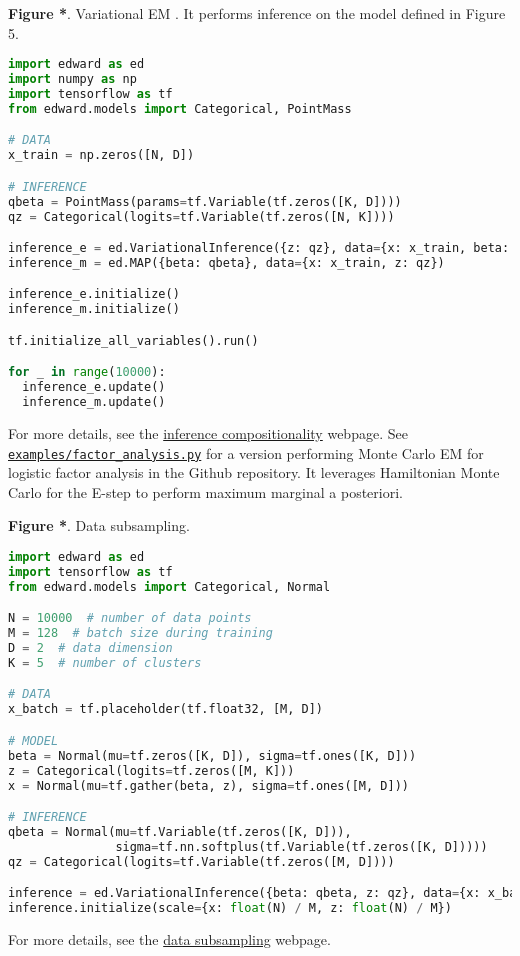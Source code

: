 \textbf{Figure *}. Variational EM \citep{neal1993new}.
It performs inference on the model defined in Figure 5.
\begin{lstlisting}[language=python]
import edward as ed
import numpy as np
import tensorflow as tf
from edward.models import Categorical, PointMass

# DATA
x_train = np.zeros([N, D])

# INFERENCE
qbeta = PointMass(params=tf.Variable(tf.zeros([K, D])))
qz = Categorical(logits=tf.Variable(tf.zeros([N, K])))

inference_e = ed.VariationalInference({z: qz}, data={x: x_train, beta: qbeta})
inference_m = ed.MAP({beta: qbeta}, data={x: x_train, z: qz})

inference_e.initialize()
inference_m.initialize()

tf.initialize_all_variables().run()

for _ in range(10000):
  inference_e.update()
  inference_m.update()
\end{lstlisting}
For more details, see the
\href{/api/inference-compositionality}{inference compositionality} webpage.
See
\href{https://github.com/blei-lab/edward/blob/master/examples/factor_analysis.py}{\texttt{examples/factor_analysis.py}} for
a version performing Monte Carlo EM for logistic factor analysis
in the Github repository.
It leverages Hamiltonian Monte Carlo for the E-step to perform maximum
marginal a posteriori.

\textbf{Figure *}. Data subsampling.
\begin{lstlisting}[language=python]
import edward as ed
import tensorflow as tf
from edward.models import Categorical, Normal

N = 10000  # number of data points
M = 128  # batch size during training
D = 2  # data dimension
K = 5  # number of clusters

# DATA
x_batch = tf.placeholder(tf.float32, [M, D])

# MODEL
beta = Normal(mu=tf.zeros([K, D]), sigma=tf.ones([K, D]))
z = Categorical(logits=tf.zeros([M, K]))
x = Normal(mu=tf.gather(beta, z), sigma=tf.ones([M, D]))

# INFERENCE
qbeta = Normal(mu=tf.Variable(tf.zeros([K, D])),
               sigma=tf.nn.softplus(tf.Variable(tf.zeros([K, D]))))
qz = Categorical(logits=tf.Variable(tf.zeros([M, D])))

inference = ed.VariationalInference({beta: qbeta, z: qz}, data={x: x_batch})
inference.initialize(scale={x: float(N) / M, z: float(N) / M})
\end{lstlisting}
For more details, see the
\href{/api/inference-data-subsampling}{data subsampling} webpage.

